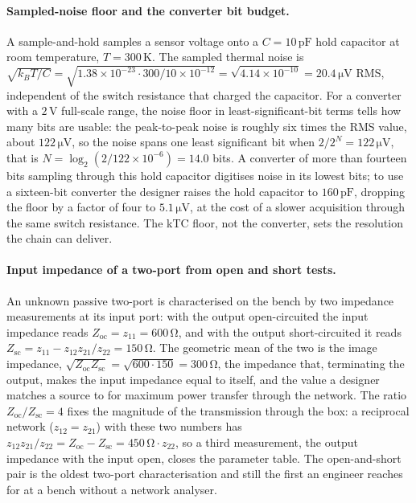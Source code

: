 \paragraph{Sampled-noise floor and the converter bit budget.}
A sample-and-hold samples a sensor voltage onto a $C = 10\,\si{\pico
\farad}$ hold capacitor at room temperature, $T = 300\,\si{\kelvin}$. The
sampled thermal noise is $\sqrt{k_B T/C} = \sqrt{1.38\times 10^{-23}\cdot
300/10\times 10^{-12}} = \sqrt{4.14\times 10^{-10}} = 20.4\,\si{\micro
\volt}$ RMS, independent of the switch resistance that charged the
capacitor. For a converter with a $2\,\si{\volt}$ full-scale range, the
noise floor in least-significant-bit terms tells how many bits are usable:
the peak-to-peak noise is roughly six times the RMS value, about
$122\,\si{\micro\volt}$, so the noise spans one least significant bit when
$2/2^{N} = 122\,\si{\micro\volt}$, that is $N = \log_2(2/122\times
10^{-6}) = 14.0$ bits. A converter of more than fourteen bits sampling
through this hold capacitor digitises noise in its lowest bits; to use a
sixteen-bit converter the designer raises the hold capacitor to
$160\,\si{\pico\farad}$, dropping the floor by a factor of four to
$5.1\,\si{\micro\volt}$, at the cost of a slower acquisition through the
same switch resistance. The kTC floor, not the converter, sets the
resolution the chain can deliver.

\paragraph{Input impedance of a two-port from open and short tests.}
An unknown passive two-port is characterised on the bench by two
impedance measurements at its input port: with the output open-circuited
the input impedance reads $Z_{\text{oc}} = z_{11} = 600\,\si{\ohm}$, and
with the output short-circuited it reads $Z_{\text{sc}} = z_{11} -
z_{12}z_{21}/z_{22} = 150\,\si{\ohm}$. The geometric mean of the two is
the image impedance, $\sqrt{Z_{\text{oc}}Z_{\text{sc}}} = \sqrt{600\cdot
150} = 300\,\si{\ohm}$, the impedance that, terminating the output, makes
the input impedance equal to itself, and the value a designer matches a
source to for maximum power transfer through the network. The ratio
$Z_{\text{oc}}/Z_{\text{sc}} = 4$ fixes the magnitude of the transmission
through the box: a reciprocal network ($z_{12} = z_{21}$) with these two
numbers has $z_{12}z_{21}/z_{22} = Z_{\text{oc}} - Z_{\text{sc}} =
450\,\si{\ohm}\cdot z_{22}$, so a third measurement, the output impedance
with the input open, closes the parameter table. The open-and-short pair
is the oldest two-port characterisation and still the first an engineer
reaches for at a bench without a network analyser.

